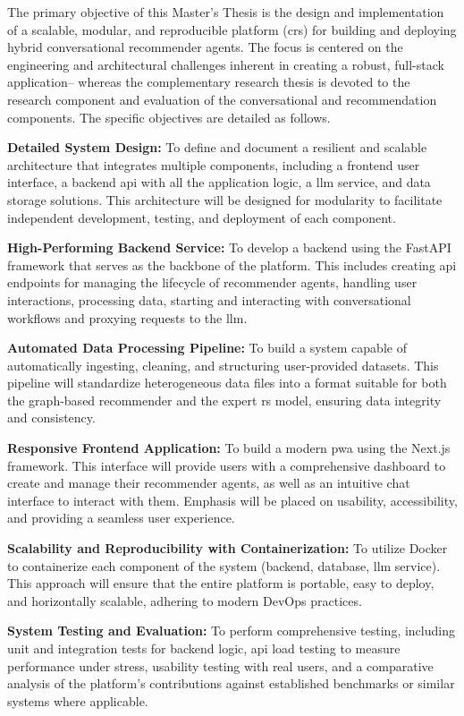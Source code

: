 The primary objective of this Master's Thesis is the design and implementation of a scalable, modular, and reproducible platform (\acl{crs}) for building and deploying hybrid conversational recommender agents. The focus is centered on the engineering and architectural challenges inherent in creating a robust, full-stack application-- whereas the complementary research thesis \cite{MUI2ICSI:SOTA} is devoted to the research component and evaluation of the conversational and recommendation components. The specific objectives are detailed as follows.

\begin{objetive}
    \item \textbf{Detailed System Design:} To define and document a resilient and scalable architecture that integrates multiple components, including a frontend user interface, a backend \acs{api} with all the application logic, a \ac{llm} service, and data storage solutions. This architecture will be designed for modularity to facilitate independent development, testing, and deployment of each component.

    \item \textbf{High-Performing Backend Service:} To develop a backend using the FastAPI framework that serves as the backbone of the platform. This includes creating \acs{api} endpoints for managing the lifecycle of recommender agents, handling user interactions, processing data, starting and interacting with conversational workflows and proxying requests to the \ac{llm}.

    \item \textbf{Automated Data Processing Pipeline:} To build a system capable of automatically ingesting, cleaning, and structuring user-provided datasets. This pipeline will standardize heterogeneous data files into a format suitable for both the graph-based recommender and the expert \acs{rs} model, ensuring data integrity and consistency.

    \item \textbf{Responsive Frontend Application:} To build a modern \ac{pwa} using the Next.js framework. This interface will provide users with a comprehensive dashboard to create and manage their recommender agents, as well as an intuitive chat interface to interact with them. Emphasis will be placed on usability, accessibility, and providing a seamless user experience.

    \item \textbf{Scalability and Reproducibility with Containerization:} To utilize Docker to containerize each component of the system (backend, database, \ac{llm} service). This approach will ensure that the entire platform is portable, easy to deploy, and horizontally scalable, adhering to modern DevOps practices.

    \item \textbf{System Testing and Evaluation:} To perform comprehensive testing, including unit and integration tests for backend logic, \acs{api} load testing to measure performance under stress, usability testing with real users, and a comparative analysis of the platform's contributions against established benchmarks or similar systems where applicable.
\end{objetive}
